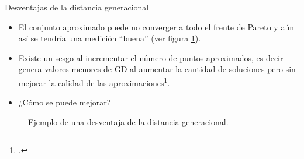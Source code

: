 \documentclass{beamer}
\begin{document}
\begin{frame}{Desventajas de la distancia generacional}
\begin{itemize}
\justifying
\scriptsize
\item El conjunto aproximado puede no converger a todo el frente de Pareto y aún así se tendría una medición ``buena'' (ver figura \ref{fig:igd}).

\item Existe un sesgo al incrementar el número de puntos aproximados, es decir genera valores menores de GD al aumentar la cantidad de soluciones pero sin mejorar la calidad de las aproximaciones\footcite{Joel:HausdorffDistance}.
\item ¿Cómo se puede mejorar?
\end{itemize}
\begin{figure}[H]
\centering

\caption{\scriptsize Ejemplo de una desventaja de la distancia generacional.} \label{fig:igd}
\end{figure}


\end{frame}
\end{document}

